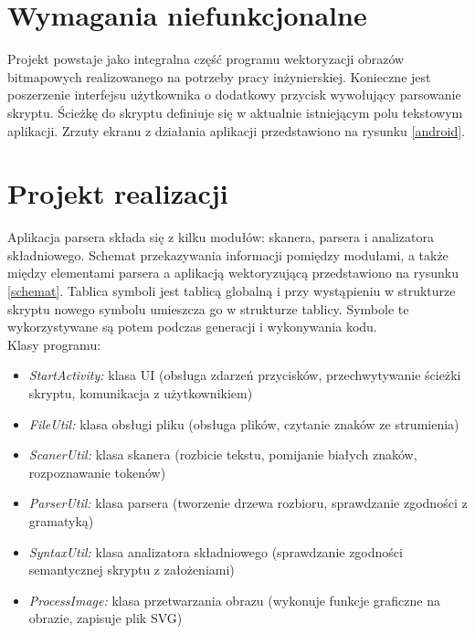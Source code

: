 \documentclass[11pt,a4paper]{article}
\begin{document}
\section{Wymagania niefunkcjonalne}
Projekt powstaje jako integralna część programu wektoryzacji obrazów bitmapowych realizowanego na potrzeby pracy inżynierskiej. Konieczne jest poszerzenie interfejsu użytkownika o dodatkowy przycisk wywołujący parsowanie skryptu. Ścieżkę do skryptu definiuje się w aktualnie istniejącym polu tekstowym aplikacji. Zrzuty ekranu z działania aplikacji przedstawiono na rysunku \ref{android}.

\section{Projekt realizacji}
Aplikacja parsera składa się z kilku modułów: skanera, parsera i analizatora składniowego. Schemat przekazywania informacji pomiędzy modułami, a także między elementami parsera a aplikacją wektoryzującą przedstawiono na rysunku \ref{schemat}. Tablica symboli jest tablicą globalną i przy wystąpieniu w strukturze skryptu nowego symbolu umieszcza go w strukturze tablicy. Symbole te wykorzystywane są potem podczas generacji i wykonywania kodu.
\\Klasy programu:
\begin{itemize}
\item \emph{StartActivity:} 	klasa UI (obsługa zdarzeń przycisków, przechwytywanie ścieżki skryptu, komunikacja z użytkownikiem)
\item \emph{FileUtil:} klasa obsługi pliku (obsługa plików, czytanie znaków ze strumienia)
\item \emph{ScanerUtil:} klasa skanera (rozbicie tekstu, pomijanie białych znaków, rozpoznawanie tokenów)
\item \emph{ParserUtil:} klasa parsera (tworzenie drzewa rozbioru, sprawdzanie zgodności z gramatyką)
\item \emph{SyntaxUtil:} klasa analizatora składniowego (sprawdzanie zgodności semantycznej skryptu z założeniami)
\item \emph{ProcessImage:} klasa przetwarzania obrazu (wykonuje funkcje graficzne na obrazie, zapisuje plik SVG)
\end{itemize}
\end{document}
